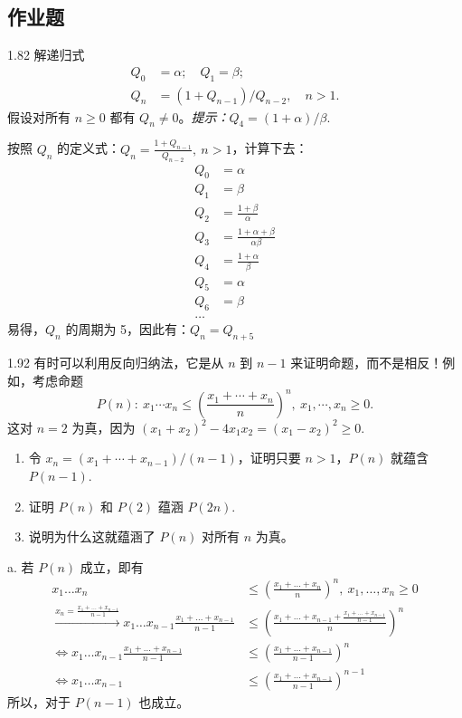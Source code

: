 \subsection{作业题}

\begin{problem}{1.8}{2}
  解递归式
  \begin{align*}
    Q_0 &= \alpha; \quad Q_1 = \beta; \\
    Q_n &= (1 + Q_{n-1}) / Q_{n-2}, \quad n > 1.
  \end{align*}
  假设对所有 \( n \geq 0 \) 都有 \( Q_n \neq 0 \)。\textit{提示：}\( Q_4 = (1 + \alpha) / \beta \).
\end{problem}

按照 \( Q_n \) 的定义式：\( Q_n = \frac{1 + Q_{n-1}}{Q_{n-2}}, \ n > 1 \)，计算下去：
\begin{align*}
  Q_0 &= \alpha \\
  Q_1 &= \beta \\
  Q_2 &= \frac{1+ \beta}{\alpha} \\
  Q_3 &= \frac{1+ \alpha + \beta}{\alpha \beta} \\
  Q_4 &= \frac{1+ \alpha}{\beta} \\
  Q_5 &= \alpha \\
  Q_6 &= \beta \\
  \dots
\end{align*}
易得，\( Q_n \) 的周期为 5，因此有：\( Q_n = Q_{n+5} \)

\begin{problem}{1.9}{2}
  有时可以利用反向归纳法，它是从 \( n \) 到 \( n-1 \) 来证明命题，而不是相反！例如，考虑命题
  \[
    P(n): \ x_1 \cdots x_n \leq \left( \frac{x_1 + \cdots + x_n}{n} \right)^n, \ x_1, \cdots, x_n \geq 0.
  \]
  这对 \( n=2 \) 为真，因为 \( (x_1 + x_2)^2 - 4 x_1 x_2 = (x_1 - x_2)^2 \geq 0 \).

  \begin{enumerate}
    \item[a] 令 \( x_n = (x_1 + \cdots + x_{n-1}) / (n-1) \)，证明只要 \( n>1 \)，\( P(n) \) 就蕴含 \( P(n-1) \).
    \item[b] 证明 \( P(n) \) 和 \( P(2) \) 蕴涵 \( P(2n) \).
    \item[c] 说明为什么这就蕴涵了 \( P(n) \) 对所有 \( n \) 为真。
  \end{enumerate}
\end{problem}

a. 若 \( P(n) \) 成立，即有
\begin{align*}
  x_1 \dots x_n &\le (\frac{x_1 + \dots + x_n}{n})^n, \ x_1, \dots, x_n \ge 0 \\
  \xrightarrow{x_n = \frac{x_1 + \dots + x_{n-1}}{n-1}} x_1 \dots x_{n-1} \frac{x_1 + \dots + x_{n-1}}{n-1} &\le (\frac{x_1 + \dots + x_{n-1} + \frac{x_1 + \dots + x_{n-1}}{n-1}}{n})^n \\
  \Leftrightarrow x_1 \dots x_{n-1} \frac{x_1 + \dots + x_{n-1}}{n-1} &\le (\frac{x_1 + \dots + x_{n-1}}{n-1})^n \\
  \Leftrightarrow x_1 \dots x_{n-1} &\le (\frac{x_1 + \dots + x_{n-1}}{n-1})^{n-1}
\end{align*}
所以，对于 \( P(n-1) \) 也成立。

